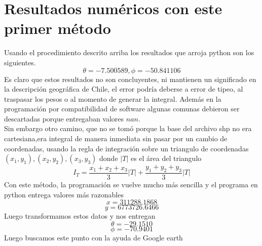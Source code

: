\documentclass[20pt]{report}
\begin{document}
\begin{itemize}
\label{cap.introduccion}\section{Resultados num\'ericos con este primer m\'etodo}
Usando el procedimiento descrito arriba los resultados  que arroja python son los siguientes.
\[\theta=-7.500589,\phi=-50.841106\]
Es claro que estos resultados no son concluyentes, ni mantienen un significado en la descripci\'on geogr\'afica de Chile, el error podr\'ia deberse a error de tipeo, al traspasar los pesos o  al momento de  generar la integral. Adem\'as en la programaci\'on por compatibilidad de software algunas comunas debieron ser descartadas porque entregaban valores $nan$. \\

Sin embargo otro camino, que no se tom\'o porque la base del archivo shp no era cartesiana,era integral de manera inmediata sin pasar por un cambio de coordenadas, usando la regla de integraci\'on sobre un triangulo de coordenadas $(x_1,y_1),(x_2,y_2),(x_3,y_3)$ donde $|T|$ es el \'area del triangulo
\[I_T=\frac{x_1+x_2+x_3}{3}|T|+\frac{y_1+y_2+y_3}{3}|T|\]
Con este m\'etodo, la programaci\'on se vuelve mucho m\'as sencilla y el programa en python entrega valores m\'as razonables
\[x=311288.1868\]
\[y=6773726.6466\]
Luego transformamos estos datos y nos entregan
\[\theta=-29.1510\]
\[\phi=-70.9401\]
Luego buscamos este punto con la ayuda de Google earth
\begin{figure}[H]
  \scalebox{0.5}{
  
}
\end{figure}
\end{itemize}
\end{document}
